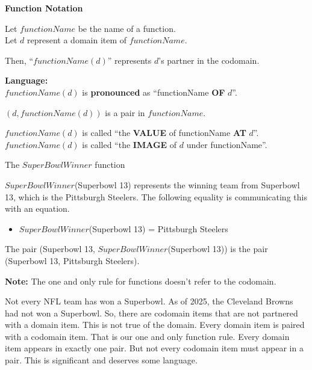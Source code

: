 \documentclass{ximera}
\begin{document}
\begin{notation} \textbf{\textcolor{red!50!green}{Function Notation}}  


Let $functionName$ be the name of a function. \\
Let $d$ represent a domain item of $functionName$.


Then, ``\textbf{\textcolor{blue!55!black}{$functionName(d)$}}'' represents $d$'s partner in the codomain. 


\textbf{\textcolor{red!70!black}{Language:}} \\
$functionName(d)$ is \textbf{\textcolor{blue!55!black}{pronounced}} as ``functionName \textbf{\textcolor{purple!85!blue}{OF}} $d$''.


$(d, functionName(d))$ is a pair in $functionName$. 


$functionName(d)$ is called ``the \textbf{\textcolor{purple!85!blue}{VALUE}} of functionName \textbf{\textcolor{purple!85!blue}{AT}} $d$''. \\
$functionName(d)$ is called ``the \textbf{\textcolor{purple!85!blue}{IMAGE}} of $d$ under functionName''. 



\end{notation}







\begin{example} The $SuperBowlWinner$ function


$SuperBowlWinner$(Superbowl 13) represents the winning team from Superbowl 13, which is the Pittsburgh Steelers.  The following equality is communicating this with an equation.

\begin{itemize}
\item $SuperBowlWinner$(Superbowl 13) = Pittsburgh Steelers  
\end{itemize}



The pair (Superbowl 13, $SuperBowlWinner$(Superbowl 13)) is the pair (Superbowl 13, Pittsburgh Steelers). 

\end{example}

\textbf{Note:} The one and only rule for functions doesn't refer to the codomain.

Not every NFL team has won a Superbowl. As of 2025, the Cleveland Browns had not won a Superbowl.  So, there are codomain items that are not partnered with a domain item.  This is not true of the domain.  Every domain item is paired with a codomain item.  That is our one and only function rule.  Every domain item appears in exactly one pair.  But not every codomain item must appear in a pair.  This is significant and deserves some language.
\end{document}
